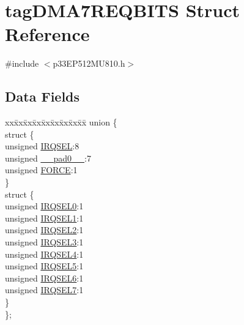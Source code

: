 \hypertarget{structtag_d_m_a7_r_e_q_b_i_t_s}{}\section{tag\+D\+M\+A7\+R\+E\+Q\+B\+I\+TS Struct Reference}
\label{structtag_d_m_a7_r_e_q_b_i_t_s}


{\ttfamily \#include $<$p33\+E\+P512\+M\+U810.\+h$>$}

\subsection*{Data Fields}
\begin{DoxyCompactItemize}
\item 
\begin{tabbing}
xx\=xx\=xx\=xx\=xx\=xx\=xx\=xx\=xx\=\kill
union \{\\
\>struct \{\\
\>\>unsigned \hyperlink{structtag_d_m_a7_r_e_q_b_i_t_s_a5e70ba01366ab2f37371d52661dd93b2}{IRQSEL}:8\\
\>\>unsigned \hyperlink{structtag_d_m_a7_r_e_q_b_i_t_s_adf71f3d8410c1f1dbbc96680a92c49af}{\_\_pad0\_\_}:7\\
\>\>unsigned \hyperlink{structtag_d_m_a7_r_e_q_b_i_t_s_a9b378a7ffc1ab4bc4a3710fb36389180}{FORCE}:1\\
\>\} \\
\>struct \{\\
\>\>unsigned \hyperlink{structtag_d_m_a7_r_e_q_b_i_t_s_ac73241b8f783760c9192dfd8a0773cad}{IRQSEL0}:1\\
\>\>unsigned \hyperlink{structtag_d_m_a7_r_e_q_b_i_t_s_a45e1f083e5a8a59f25acc35910732426}{IRQSEL1}:1\\
\>\>unsigned \hyperlink{structtag_d_m_a7_r_e_q_b_i_t_s_a60dda7474727b3624ca25fa0067a8924}{IRQSEL2}:1\\
\>\>unsigned \hyperlink{structtag_d_m_a7_r_e_q_b_i_t_s_aeaafe1b8c89398ed382054ab628aed78}{IRQSEL3}:1\\
\>\>unsigned \hyperlink{structtag_d_m_a7_r_e_q_b_i_t_s_a91c4162e0f3d4ac7adcdb49302f19840}{IRQSEL4}:1\\
\>\>unsigned \hyperlink{structtag_d_m_a7_r_e_q_b_i_t_s_a6382d50430464cf20b3dee3dbf2e8c01}{IRQSEL5}:1\\
\>\>unsigned \hyperlink{structtag_d_m_a7_r_e_q_b_i_t_s_ace52408ef8c29561f3c56a3fbcbc8217}{IRQSEL6}:1\\
\>\>unsigned \hyperlink{structtag_d_m_a7_r_e_q_b_i_t_s_acce7dedecdf1f53cdbead3edf7c5d53a}{IRQSEL7}:1\\
\>\} \\
\}; \\

\end{tabbing}\end{DoxyCompactItemize}


